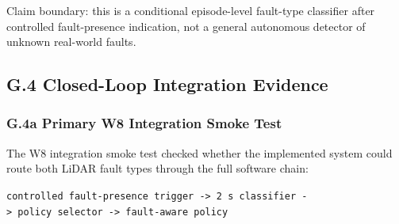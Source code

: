 Claim boundary: this is a conditional episode-level fault-type classifier after controlled fault-presence indication, not a general autonomous detector of unknown real-world faults.

\hypertarget{g.4-closed-loop-integration-evidence}{%
\subsection{G.4 Closed-Loop Integration Evidence}\label{g.4-closed-loop-integration-evidence}}

\hypertarget{g.4a-primary-w8-integration-smoke-test}{%
\subsubsection{G.4a Primary W8 Integration Smoke Test}\label{g.4a-primary-w8-integration-smoke-test}}

The W8 integration smoke test checked whether the implemented system could route both LiDAR fault types through the full software chain:

\texttt{controlled\ fault-presence\ trigger\ -\textgreater{}\ 2\ s\ classifier\ -\textgreater{}\ policy\ selector\ -\textgreater{}\ fault-aware\ policy}

